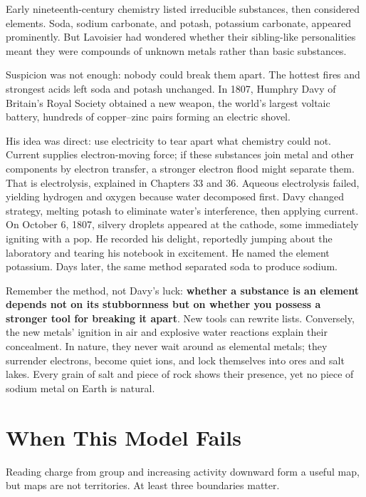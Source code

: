 \begin{zhengju}
Early nineteenth-century chemistry listed irreducible substances, then considered elements. Soda, sodium carbonate, and potash, potassium carbonate, appeared prominently. But Lavoisier had wondered whether their sibling-like personalities meant they were compounds of unknown metals rather than basic substances.

Suspicion was not enough: nobody could break them apart. The hottest fires and strongest acids left soda and potash unchanged. In 1807, Humphry Davy of Britain's Royal Society obtained a new weapon, the world's largest voltaic battery, hundreds of copper--zinc pairs forming an electric shovel.

His idea was direct: use electricity to tear apart what chemistry could not. Current supplies electron-moving force; if these substances join metal and other components by electron transfer, a stronger electron flood might separate them. That is electrolysis, explained in Chapters 33 and 36. Aqueous electrolysis failed, yielding hydrogen and oxygen because water decomposed first. Davy changed strategy, melting potash to eliminate water's interference, then applying current. On October 6, 1807, silvery droplets appeared at the cathode, some immediately igniting with a pop. He recorded his delight, reportedly jumping about the laboratory and tearing his notebook in excitement. He named the element potassium. Days later, the same method separated soda to produce sodium.

Remember the method, not Davy's luck: \textbf{whether a substance is an element depends not on its stubbornness but on whether you possess a stronger tool for breaking it apart}. New tools can rewrite lists. Conversely, the new metals' ignition in air and explosive water reactions explain their concealment. In nature, they never wait around as elemental metals; they surrender electrons, become quiet ions, and lock themselves into ores and salt lakes. Every grain of salt and piece of rock shows their presence, yet no piece of sodium metal on Earth is natural.
\end{zhengju}

\section{When This Model Fails}

Reading charge from group and increasing activity downward form a useful map, but maps are not territories. At least three boundaries matter.

